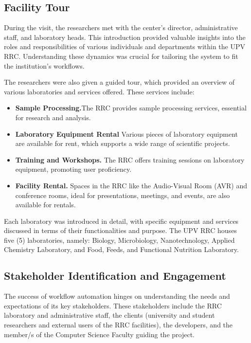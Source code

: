 \subsection{Facility Tour}
During the visit, the researchers met with the center's director, administrative staff, and laboratory heads. This introduction provided valuable insights into the roles and responsibilities of various individuals and departments within the UPV RRC. Understanding these dynamics was crucial for tailoring the system to fit the institution's workflows.

The researchers were also given a guided tour, which provided an overview of various laboratories and services offered. These services include:

\begin{itemize}
	\item \textbf{Sample Processing.}The RRC provides sample processing services, essential for research and analysis.
	\item \textbf{Laboratory Equipment Rental} Various pieces of laboratory equipment are available for rent, which supports a wide range of scientific projects.
	\item \textbf{Training and Workshops.} The RRC offers training sessions on laboratory equipment, promoting user proficiency.
	\item \textbf{Facility Rental.} Spaces in the RRC like the Audio-Visual Room (AVR) and conference rooms, ideal for presentations, meetings, and events, are also available for rentals.
\end{itemize}

Each laboratory was introduced in detail, with specific equipment and services discussed in terms of their functionalities and purpose. The UPV RRC houses five (5) laboratories, namely: Biology, Microbiology, Nanotechnology, Applied Chemistry Laboratory, and Food, Feeds, and Functional Nutrition Laboratory.

\subsection{Stakeholder Identification and Engagement}
The success of workflow automation hinges on understanding the needs and expectations of its key stakeholders. These stakeholders include the RRC laboratory and administrative staff, the clients (university and student researchers and external users of the RRC facilities), the developers, and the member/s of the Computer Science Faculty guiding the project.

